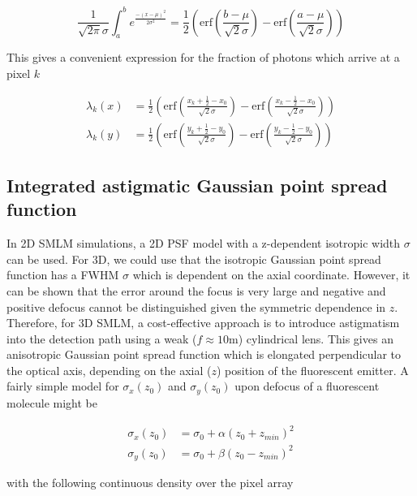 \documentclass{ucetd}
\begin{document}
\begin{equation*}
\frac{1}{\sqrt{2\pi}\sigma}\int_{a}^{b} e^{\frac{-(x-\mu)^{2}}{2\sigma^{2}}} = \frac{1}{2}\left(\mathrm{erf}\left(\frac{b-\mu}{\sqrt{2}\sigma}\right) -\mathrm{erf}\left(\frac{a-\mu}{\sqrt{2}\sigma}\right)\right)
\end{equation*}

This gives a convenient expression for the fraction of photons which arrive at a pixel $k$

\begin{align*}
\lambda_{k}(x) &= \frac{1}{2}\left(\mathrm{erf}\left(\frac{x_{k}+\frac{1}{2}-x_{0}}{\sqrt{2}\sigma}\right) -\mathrm{erf}\left(\frac{x_{k}-\frac{1}{2}-x_{0}}{\sqrt{2}\sigma}\right)\right)\\
\lambda_{k}(y) &= \frac{1}{2}\left(\mathrm{erf}\left(\frac{y_{k}+\frac{1}{2}-y_{0}}{\sqrt{2}\sigma}\right) -\mathrm{erf}\left(\frac{y_{k}-\frac{1}{2}-y_{0}}{\sqrt{2}\sigma}\right)\right)
\end{align*}

\subsection{Integrated astigmatic Gaussian point spread function}

In 2D SMLM simulations, a 2D PSF  model  with  a z-dependent  isotropic  width $\sigma$ can  be  used. For 3D, we could use that the isotropic Gaussian point spread function has a FWHM $\sigma$ which is dependent on the axial coordinate. However, it can be shown that the error around the focus is very large and negative and positive defocus cannot be distinguished given the symmetric dependence in $z$.  Therefore, for 3D SMLM, a cost-effective approach is to introduce astigmatism into the detection path using a weak ($f\approx 10\mathrm{m}$) cylindrical lens. This gives an anisotropic Gaussian point spread function which is elongated perpendicular to the optical axis, depending on the axial ($z$) position of the fluorescent emitter. A fairly simple model for $\sigma_{x}(z_{0})$ and $\sigma_{y}(z_{0})$ upon defocus of a fluorescent molecule might be

\begin{align*}
\sigma_{x}(z_{0}) &= \sigma_{0} + \alpha(z_{0}+z_{min})^{2}\\
\sigma_{y}(z_{0}) &= \sigma_{0} + \beta(z_{0}-z_{min})^{2}
\end{align*}

with the following continuous density over the pixel array
\end{document}
